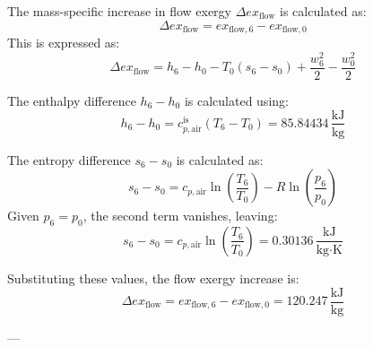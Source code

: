 The mass-specific increase in flow exergy \( \Delta ex_{\text{flow}} \) is calculated as:  
\[
\Delta ex_{\text{flow}} = ex_{\text{flow},6} - ex_{\text{flow},0}
\]  
This is expressed as:  
\[
\Delta ex_{\text{flow}} = h_6 - h_0 - T_0(s_6 - s_0) + \frac{w_6^2}{2} - \frac{w_0^2}{2}
\]  

The enthalpy difference \( h_6 - h_0 \) is calculated using:  
\[
h_6 - h_0 = c_{p,\text{air}}^{\text{is}} (T_6 - T_0) = 85.84434 \, \frac{\text{kJ}}{\text{kg}}
\]  

The entropy difference \( s_6 - s_0 \) is calculated as:  
\[
s_6 - s_0 = c_{p,\text{air}} \ln \left( \frac{T_6}{T_0} \right) - R \ln \left( \frac{p_6}{p_0} \right)
\]  
Given \( p_6 = p_0 \), the second term vanishes, leaving:  
\[
s_6 - s_0 = c_{p,\text{air}} \ln \left( \frac{T_6}{T_0} \right) = 0.30136 \, \frac{\text{kJ}}{\text{kg·K}}
\]  

Substituting these values, the flow exergy increase is:  
\[
\Delta ex_{\text{flow}} = ex_{\text{flow},6} - ex_{\text{flow},0} = 120.247 \, \frac{\text{kJ}}{\text{kg}}
\]  

---